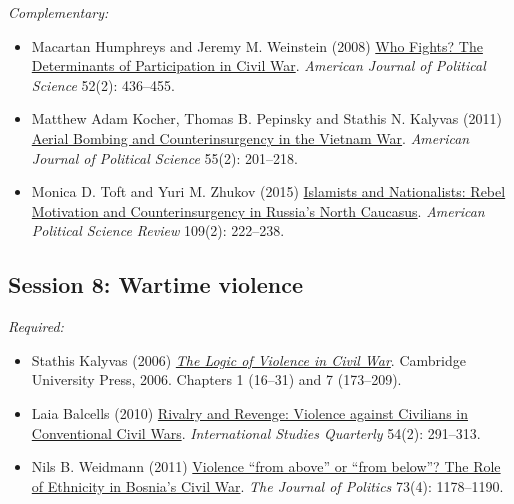 \documentclass[12pt, a4paper]{article}
\begin{document}
\noindent\textit{Complementary:}

\begin{itemize}
	\item Macartan Humphreys and Jeremy M. Weinstein (2008) \href{https://doi.org/10.1111/j.1540-5907.2008.00322.x}{Who Fights? The Determinants of Participation in Civil War}. \textit{American Journal of Political Science} 52(2): 436--455.
	\item Matthew Adam Kocher, Thomas B. Pepinsky and Stathis N. Kalyvas (2011) \href{https://doi.org/10.1111/j.1540-5907.2010.00498.x}{Aerial Bombing and Counterinsurgency in the Vietnam War}. \textit{American Journal of Political Science} 55(2): 201--218.
	\item Monica D. Toft and Yuri M. Zhukov (2015) \href{https://doi.org/10.1017/S000305541500012X}{Islamists and Nationalists: Rebel Motivation and Counterinsurgency in Russia's North Caucasus}. \textit{American Political Science Review} 109(2): 222--238.
\end{itemize}



\vspace{20pt}
\hline
\subsection*{Session 8: Wartime violence}

\noindent\textit{Required:}

\begin{itemize}
  \item Stathis Kalyvas (2006) \href{https://bibliotecas.uc3m.es/permalink/f/1nggclj/34UC3M_ALMA21161986050004213}{\textit{The Logic of Violence in Civil War}}. Cambridge University Press, 2006. Chapters 1 (16--31) and 7 (173--209).
  \item Laia Balcells (2010) \href{https://doi.org/10.1111/j.1468-2478.2010.00588.x}{Rivalry and Revenge: Violence against Civilians in Conventional Civil Wars}. \textit{International Studies Quarterly} 54(2): 291--313.
  \item Nils B. Weidmann (2011) \href{https://doi.org/10.1017/S0022381611000831}{Violence ``from above'' or ``from below''? The Role of Ethnicity in Bosnia’s Civil War}. \textit{The Journal of Politics} 73(4): 1178--1190.
\end{itemize}
\end{document}
